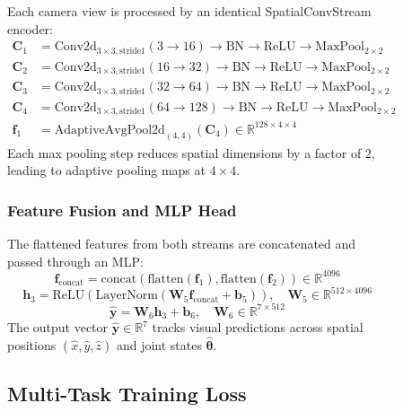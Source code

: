 \documentclass[12pt,a4paper,oneside]{report}
\begin{document}
\begin{figure}[H]
Each camera view is processed by an identical SpatialConvStream encoder:
\begin{align}
\mathbf{C}_1 &= \text{Conv2d}_{3\times3,\text{stride}1}(3 \rightarrow 16) \rightarrow \text{BN} \rightarrow \text{ReLU} \rightarrow \text{MaxPool}_{2\times2} \\
\mathbf{C}_2 &= \text{Conv2d}_{3\times3,\text{stride}1}(16 \rightarrow 32) \rightarrow \text{BN} \rightarrow \text{ReLU} \rightarrow \text{MaxPool}_{2\times2} \\
\mathbf{C}_3 &= \text{Conv2d}_{3\times3,\text{stride}1}(32 \rightarrow 64) \rightarrow \text{BN} \rightarrow \text{ReLU} \rightarrow \text{MaxPool}_{2\times2} \\
\mathbf{C}_4 &= \text{Conv2d}_{3\times3,\text{stride}1}(64 \rightarrow 128) \rightarrow \text{BN} \rightarrow \text{ReLU} \rightarrow \text{MaxPool}_{2\times2} \\
\mathbf{f}_1 &= \text{AdaptiveAvgPool2d}_{(4,4)}(\mathbf{C}_4) \in \mathbb{R}^{128 \times 4 \times 4}
\end{align}
Each max pooling step reduces spatial dimensions by a factor of 2, leading to adaptive pooling maps at $4 \times 4$.

\subsubsection{Feature Fusion and MLP Head}

The flattened features from both streams are concatenated and passed through an MLP:
\begin{equation}
\mathbf{f}_{\text{concat}} = \text{concat}(\text{flatten}(\mathbf{f}_1), \text{flatten}(\mathbf{f}_2)) \in \mathbb{R}^{4096}
\end{equation}
\begin{equation}
\mathbf{h}_3 = \text{ReLU}(\text{LayerNorm}(\mathbf{W}_5 \mathbf{f}_{\text{concat}} + \mathbf{b}_5)), \quad \mathbf{W}_5 \in \mathbb{R}^{512 \times 4096}
\end{equation}
\begin{equation}
\hat{\mathbf{y}} = \mathbf{W}_6 \mathbf{h}_3 + \mathbf{b}_6, \quad \mathbf{W}_6 \in \mathbb{R}^{7 \times 512}
\end{equation}
The output vector $\hat{\mathbf{y}} \in \mathbb{R}^7$ tracks visual predictions across spatial positions $(\hat{x}, \hat{y}, \hat{z})$ and joint states $\hat{\boldsymbol{\theta}}$.

\subsection{Multi-Task Training Loss}


\end{figure}
\end{document}
